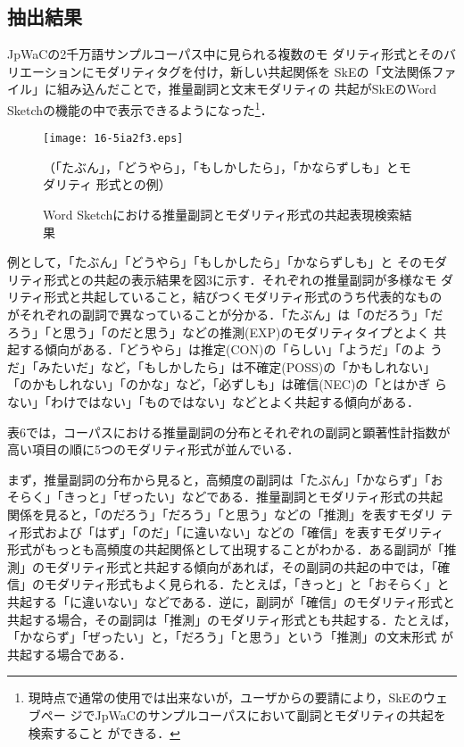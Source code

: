 \documentclass[japanese]{jnlp_1.4}
\begin{document}
\subsection{抽出結果}

JpWaCの2千万語サンプルコーパス中に見られる複数のモ
ダリティ形式とそのバリエーションにモダリティタグを付け，新しい共起関係を
SkEの「文法関係ファイル」に組み込んだことで，推量副詞と文末モダリティの
共起がSkEのWord Sketchの機能の中で表示できるようになった\footnote{
	現時点で通常の使用では出来ないが，ユーザからの要請により，SkEのウェブペー
	ジでJpWaCのサンプルコーパスにおいて副詞とモダリティの共起を検索すること
	ができる．}．

\begin{figure}[b]
\begin{center}
\texttt{[image: 16-5ia2f3.eps]}
\caption{Word Sketchにおける推量副詞とモダリティ形式の共起表現検索結果}
（「たぶん」，「どうやら」，「もしかしたら」，「かならずしも」とモダリティ
 形式との例）
\end{center}
\end{figure}

例として，「たぶん」「どうやら」「もしかしたら」「かならずしも」と
そのモダリティ形式との共起の表示結果を図3に示す．それぞれの推量副詞が多様なモ
ダリティ形式と共起していること，結びつくモダリティ形式のうち代表的なもの
がそれぞれの副詞で異なっていることが分かる．「たぶん」は「のだろう」「だ
ろう」「と思う」「のだと思う」などの推測(EXP)のモダリティタイプとよく
共起する傾向がある．「どうやら」は推定(CON)の「らしい」「ようだ」「のよ
うだ」「みたいだ」など，「もしかしたら」は不確定(POSS)の「かもしれない」
「のかもしれない」「のかな」など，「必ずしも」は確信(NEC)の「とはかぎ
らない」「わけではない」「ものではない」などとよく共起する傾向がある．

表6では，コーパスにおける推量副詞の分布とそれぞれの副詞と顕著性計指数が
高い項目の順に5つのモダリティ形式が並んでいる．

まず，推量副詞の分布から見ると，高頻度の副詞は「たぶん」「かならず」「お
そらく」「きっと」「ぜったい」などである．推量副詞とモダリティ形式の共起
関係を見ると，「のだろう」「だろう」「と思う」などの「推測」を表すモダリ
ティ形式および「はず」「のだ」「に違いない」などの「確信」を表すモダリティ
形式がもっとも高頻度の共起関係として出現することがわかる．ある副詞が「推
測」のモダリティ形式と共起する傾向があれば，その副詞の共起の中では，「確
信」のモダリティ形式もよく見られる．たとえば，「きっと」と「おそらく」と
共起する「に違いない」などである．逆に，副詞が「確信」のモダリティ形式と
共起する場合，その副詞は「推測」のモダリティ形式とも共起する．たとえば，
「かならず」「ぜったい」と，「だろう」「と思う」という「推測」の文末形式
が共起する場合である．
\end{document}
